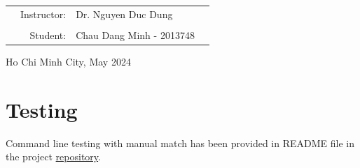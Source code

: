 \documentclass[a4paper]{report}
\begin{document}
\begin{titlepage}
  \begin{table}[h]
    \begin{tabular}{rrll}

      \hspace{5 cm}
       & Instructor: & Dr. Nguyen Duc Dung      \\
       &             &                          \\
       & Student:    & Chau Dang Minh - 2013748 \\
    \end{tabular}
  \end{table}
  \vspace{2cm}
  \begin{center}
    {\footnotesize Ho Chi Minh City, May 2024}
  \end{center}
\end{titlepage}
\tableofcontents
\newpage



\section{Testing}
Command line testing with manual match has been provided in README file in the project \href{https://github.com/mintcd/compiler-design.git}{repository}.

\printbibliography
\end{document}
